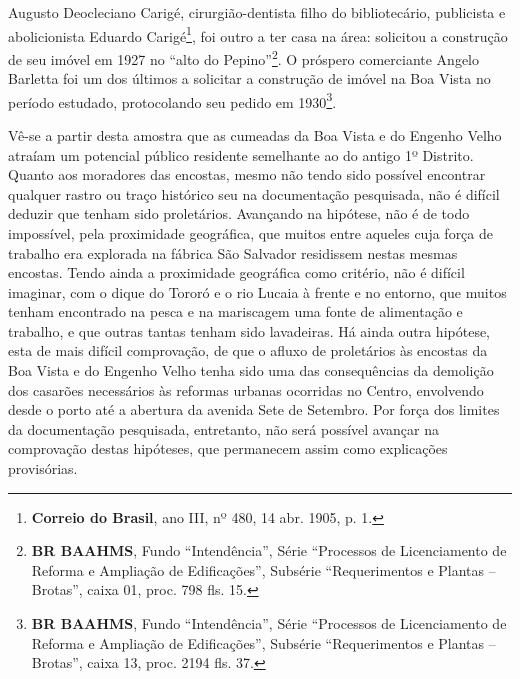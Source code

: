 Augusto Deocleciano Carigé, cirurgião-dentista filho do bibliotecário, publicista e abolicionista Eduardo Carigé\footnote{\textbf{Correio do Brasil}, ano III, nº 480, 14 abr. 1905, p. 1.}, foi outro a ter casa na área: solicitou a construção de seu imóvel em 1927 no ``alto do Pepino''\footnote{\textbf{BR BAAHMS}, Fundo ``Intendência'', Série ``Processos de Licenciamento de Reforma e Ampliação de Edificações'', Subsérie ``Requerimentos e Plantas -- Brotas'', caixa 01, proc. 798 fls. 15.}. O próspero comerciante Angelo Barletta foi um dos últimos a solicitar a construção de imóvel na Boa Vista no período estudado, protocolando seu pedido em 1930\footnote{\textbf{BR BAAHMS}, Fundo ``Intendência'', Série ``Processos de Licenciamento de Reforma e Ampliação de Edificações'', Subsérie ``Requerimentos e Plantas -- Brotas'', caixa 13, proc. 2194 fls. 37.}.

Vê-se a partir desta amostra que as cumeadas da Boa Vista e do Engenho Velho atraíam um potencial público residente semelhante ao do antigo 1º Distrito. Quanto aos moradores das encostas, mesmo não tendo sido possível encontrar qualquer rastro ou traço histórico seu na documentação pesquisada, não é difícil deduzir que tenham sido proletários. Avançando na hipótese, não é de todo impossível, pela proximidade geográfica, que muitos entre aqueles cuja força de trabalho era explorada na fábrica São Salvador residissem nestas mesmas encostas. Tendo ainda a proximidade geográfica como critério, não é difícil imaginar, com o dique do Tororó e o rio Lucaia à frente e no entorno, que muitos tenham encontrado na pesca e na mariscagem uma fonte de alimentação e trabalho, e que outras tantas tenham sido lavadeiras. Há ainda outra hipótese, esta de mais difícil comprovação, de que o afluxo de proletários às encostas da Boa Vista e do Engenho Velho tenha sido uma das consequências da demolição dos casarões necessários às reformas urbanas ocorridas no Centro, envolvendo desde o porto até a abertura da avenida Sete de Setembro. Por força dos limites da documentação pesquisada, entretanto, não será possível avançar na comprovação destas hipóteses, que permanecem assim como explicações provisórias.


